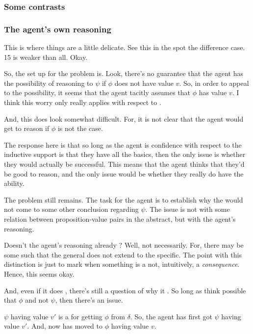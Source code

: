 \subsubsection{Some contrasts}
\label{sec:some-contrasts}


\subsubsection{The agent's own reasoning}
\label{sec:agents-own-reasoning}

\begin{note}
  This is where things are a little delicate.
  See this in the spot the difference case.
  15 is weaker than all.
  Okay.

  So, the set up for the problem is.
  Look, there's no guarantee that the agent has the possibility of reasoning to \(\psi\) if \(\phi\) does not have value \(v\).
  So, in order to appeal to the possibility, it seems that the agent tacitly assumes that \(\phi\) has value \(v\).
  I think this worry only really applies with respect to \LCS{}.

  And, this does look somewhat difficult.
  For, it is not clear that the agent would get to reason if \(\phi\) is not the case.

  The response here is that so long as the agent is confidence with respect to the inductive support is that they have all the basics, then the only issue is whether they would actually be successful.
  This means that the agent thinks that they'd be good to reason, and the only issue would be whether they really do have the ability.

  The problem still remains.
  The task for the agent is to establish why the would not come to some other conclusion regarding \(\psi\).
  The issue is not with some relation between proposition-value pairs in the abstract, but with the agent's reasoning.

  Doesn't the agent's reasoning already \indicateN{}?
  Well, not necessarily.
  For, there may be some \epPW{} such that the general does not extend to the specific.
  The point with this distinction is just to mark when something is a not, intuitively, a \emph{consequence}.
  Hence, this seems okay.

  And, even if it does \indicateV{}, there's still a question of why it \indicateV{}.
  So long as think possible that \(\phi\) and not \(\psi\), then there's an issue.


  \(\psi\) having value \(v'\) is a \requ{} for getting \(\phi\) from \(\delta\).
  So, the agent has first got \(\psi\) having value \(v'\).
  And, now has moved to \(\phi\) having value \(v\).


\end{note}
